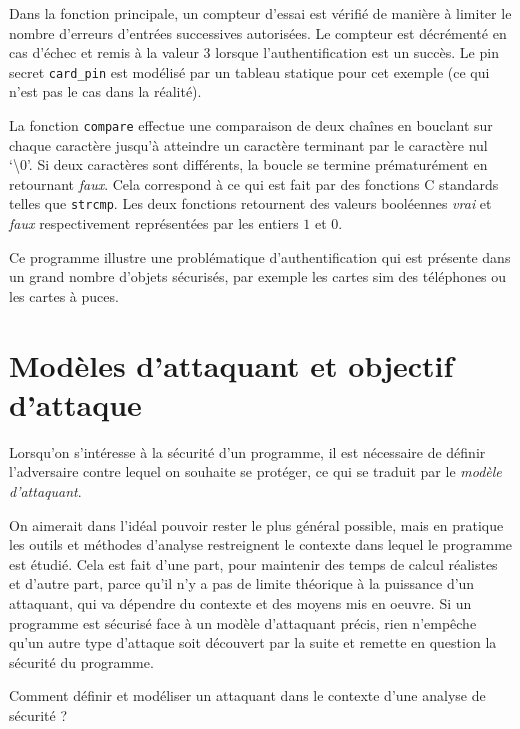         Dans la fonction principale, un compteur d'essai est vérifié de manière à limiter le nombre d'erreurs d'entrées successives autorisées. Le compteur est décrémenté en cas d'échec et remis à la valeur 3 lorsque l'authentification est un succès. Le \gls{pin} secret \texttt{card\_pin} est modélisé par un tableau statique pour cet exemple (ce qui n'est pas le cas dans la réalité).        
        
        La fonction \texttt{compare} effectue une comparaison de deux chaînes en bouclant sur chaque caractère jusqu'à atteindre un caractère terminant par le caractère nul `\textbackslash0'. Si deux caractères sont différents, la boucle se termine prématurément en retournant \textit{faux}. Cela correspond à ce qui est fait par des fonctions C standards telles que \texttt{strcmp}.
        Les deux fonctions retournent des valeurs booléennes \textit{vrai} et \textit{faux} respectivement représentées par les entiers $1$ et $0$.
        
        Ce programme illustre une problématique d'authentification qui est présente dans un grand nombre d'objets sécurisés, par exemple les cartes \gls{sim} des téléphones ou les cartes à puces.     
        
    \section{Modèles d'attaquant et objectif d'attaque}
    \label{sec:model-attack}
    
        Lorsqu'on s'intéresse à la sécurité d'un programme, il est nécessaire de définir l'adversaire contre lequel on souhaite se protéger, ce qui se traduit par le \textit{modèle d'attaquant}.
        
        On aimerait dans l'idéal pouvoir rester le plus général possible, mais en pratique les outils et méthodes d'analyse restreignent le contexte dans lequel le programme est étudié. Cela est fait d'une part, pour maintenir des temps de calcul réalistes et d'autre part, parce qu'il n'y a pas de limite théorique à la puissance d'un attaquant, qui va dépendre du contexte et des moyens mis en oeuvre. Si un programme est sécurisé face à un modèle d'attaquant précis, rien n'empêche qu'un autre type d'attaque soit découvert par la suite et remette en question la sécurité du programme. 
        
        \begin{probl}
        \label{prob:attack-model}
            Comment définir et modéliser un attaquant dans le contexte d'une analyse de sécurité ?
        \end{probl}
        
